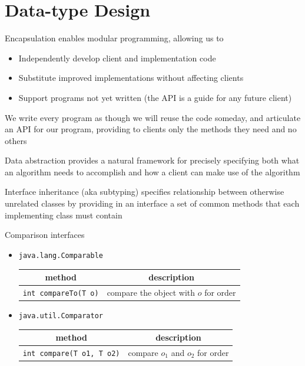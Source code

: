 \documentclass[8pt,a4paper,compress]{beamer}
\begin{document}
\section{Data-type Design}
\begin{frame}[fragile]
\pause

Encapsulation enables modular programming, allowing us to
\begin{itemize}
\item Independently develop client and implementation code
\item Substitute improved implementations without affecting clients
\item Support programs not yet written (the API is a guide for any future client)
\end{itemize}

\pause
\bigskip

We write every program as though we will reuse the code someday, and articulate an API for our program, providing to clients only the methods they need and no others

\pause
\bigskip

Data abstraction provides a natural framework for precisely specifying both what an algorithm needs to accomplish and how a client can make use of the algorithm
\end{frame}

\begin{frame}[fragile]
\pause

Interface inheritance (aka subtyping) specifies relationship between otherwise unrelated classes by providing in an interface a set of common methods that each implementing class must contain

\pause
\bigskip

Comparison interfaces
\begin{itemize}
\item \lstinline{java.lang.Comparable}
\begin{center}
\begin{tabular}{cc}
method & description \\ \hline
\lstinline$int compareTo(T o)$ & compare the object with $o$ for order
\end{tabular} 
\end{center}

\item \lstinline{java.util.Comparator}
\begin{center}
\begin{tabular}{cc}
method & description \\ \hline
\lstinline$int compare(T o1, T o2)$ & compare $o_1$ and $o_2$ for order
\end{tabular} 
\end{center}
\end{itemize}
\end{frame}
\end{document}
